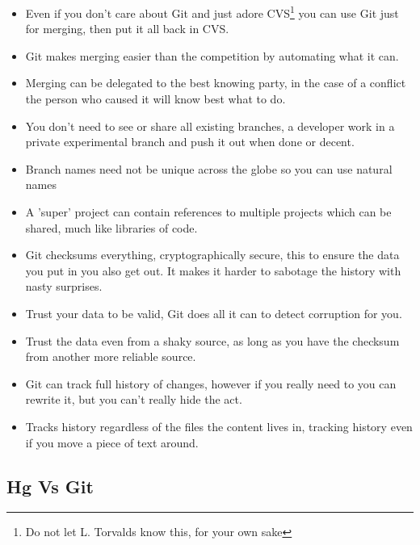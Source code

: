 \begin{itemize}
\item
Even if you don't care about Git and just adore CVS\footnote{Do not let L. Torvalds know this, for your own sake}
you can use Git just for merging, then put it all back in CVS.

\item
Git makes merging easier than the competition by automating what it can.

\item
Merging can be delegated to the best knowing party, in the case of a conflict the person who caused it will know best what to do.

\item
You don't need to see or share all existing branches, a developer work in a private experimental branch and push it out when done or decent.

\item
Branch names need not be unique across the globe so you can use natural names

\item
A 'super' project can contain references to multiple projects which can be shared, much like libraries of code.

\item
Git checksums everything, cryptographically secure, this to ensure the data you put in you also get out. It makes it harder to sabotage the history with nasty surprises.

\item
Trust your data to be valid, Git does all it can to detect corruption for you.

\item Trust the data even from a shaky source, as long as you have the checksum from another more reliable source.


\item
Git can track full history of changes, however if you really need to you can rewrite it, but you can't really hide the act.

\item
Tracks history regardless of the files the content lives in, tracking history even if you move a piece of text around.

\end{itemize}


\subsection{Hg Vs Git}
\label{sect:rebase}

